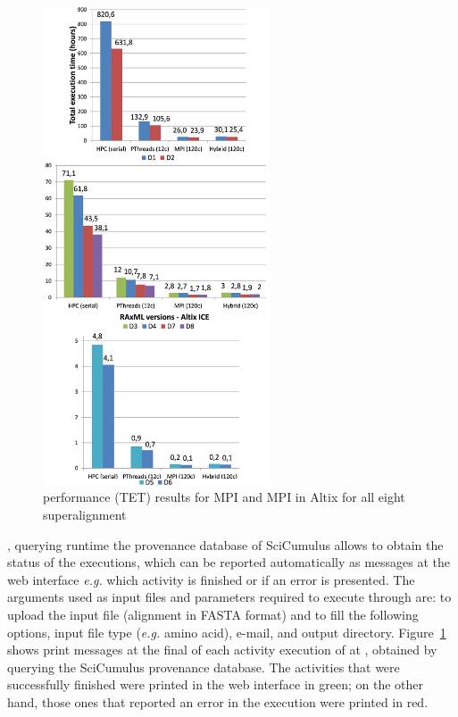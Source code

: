 \begin{figure}[!htb]
\centering
\includegraphics[width=0.6\textwidth]{imgs/raxmlTETAllD.png}
\vspace{-12px}
\caption{\system performance (TET) results for \raxml MPI and \raxml MPI in Altix for all eight superalignment}
\label{fig:raxmlTETAllD}
\end{figure}

\vspace{5px}
\noindent
\underline{\textbf{\sci}}, querying runtime the provenance database of SciCumulus allows to obtain the status of the \sci executions, which can be reported automatically as messages at the web interface \textit{e.g.} which activity is finished or if an error is presented. The arguments used as input files and parameters required to execute \sci through \system are: to upload the input file (alignment in FASTA format) and to fill the following options, input file type (\textit{e.g.} amino acid), e-mail, and output directory. Figure~\ref{fig:raxmlTETAllD} shows print messages at the final of each activity execution of \sci at \system, obtained by querying the SciCumulus provenance database. The activities that were successfully finished were printed in the web interface in green; on the other hand, those ones that reported an error in the execution were printed in red. 

